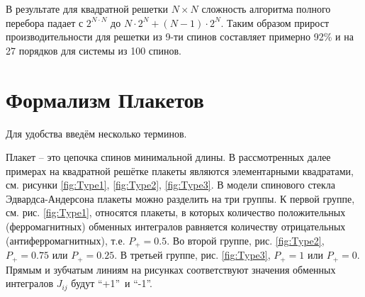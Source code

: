 \documentclass[utf8, babel, sor, jor, amsmath, amssymb, reprint]{elsarticle} %
\begin{document}
В результате для квадратной решетки $N \times N$ сложность алгоритма полного перебора падает с $2^{N \cdot N}$ до $N \cdot 2^N + (N - 1) \cdot 2^N$. Таким образом прирост производительности для решетки из 9-ти спинов составляет примерно 92\% и на 27 порядков для системы из 100 спинов.


\section{Формализм Плакетов}

Для удобства введём несколько терминов.


Плакет – это цепочка спинов минимальной длины. В рассмотренных далее примерах на квадратной решётке плакеты являются элементарными квадратами, см. рисунки \ref{fig:Type1}, \ref{fig:Type2}, \ref{fig:Type3}. В модели спинового стекла Эдвардса-Андерсона плакеты можно разделить на три группы. К первой группе, см. рис. \ref{fig:Type1}, относятся плакеты, в которых количество положительных (ферромагнитных) обменных интегралов равняется количеству отрицательных (антиферромагнитных), т.е. $P_+=0.5$. Во второй группе, рис. \ref{fig:Type2}, $P_+=0.75$ или $P_+=0.25$. В третьей группе, рис. \ref{fig:Type3}, $P_+=1$ или $P_+=0$. Прямым и зубчатым линиям на рисунках соответствуют значения обменных интегралов $J_{ij}$ будут \textquotedblleft +1\textquotedblright ~и \textquotedblleft -1\textquotedblright.
\end{document}
